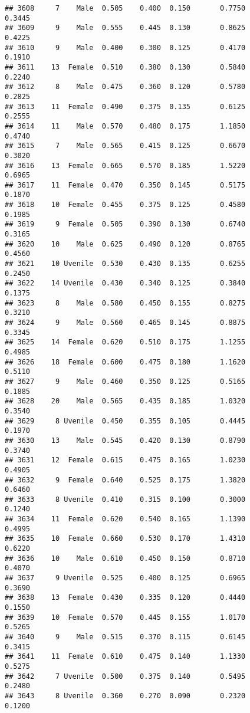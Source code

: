 \documentclass[
]{article}
\begin{document}
\begin{verbatim}
## 3608     7    Male  0.505    0.400  0.150       0.7750         0.3445
## 3609     9    Male  0.555    0.445  0.130       0.8625         0.4225
## 3610     9    Male  0.400    0.300  0.125       0.4170         0.1910
## 3611    13  Female  0.510    0.380  0.130       0.5840         0.2240
## 3612     8    Male  0.475    0.360  0.120       0.5780         0.2825
## 3613    11  Female  0.490    0.375  0.135       0.6125         0.2555
## 3614    11    Male  0.570    0.480  0.175       1.1850         0.4740
## 3615     7    Male  0.565    0.415  0.125       0.6670         0.3020
## 3616    13  Female  0.665    0.570  0.185       1.5220         0.6965
## 3617    11  Female  0.470    0.350  0.145       0.5175         0.1870
## 3618    10  Female  0.455    0.375  0.125       0.4580         0.1985
## 3619     9  Female  0.505    0.390  0.130       0.6740         0.3165
## 3620    10    Male  0.625    0.490  0.120       0.8765         0.4560
## 3621    10 Uvenile  0.530    0.430  0.135       0.6255         0.2450
## 3622    14 Uvenile  0.430    0.340  0.125       0.3840         0.1375
## 3623     8    Male  0.580    0.450  0.155       0.8275         0.3210
## 3624     9    Male  0.560    0.465  0.145       0.8875         0.3345
## 3625    14  Female  0.620    0.510  0.175       1.1255         0.4985
## 3626    18  Female  0.600    0.475  0.180       1.1620         0.5110
## 3627     9    Male  0.460    0.350  0.125       0.5165         0.1885
## 3628    20    Male  0.565    0.435  0.185       1.0320         0.3540
## 3629     8 Uvenile  0.450    0.355  0.105       0.4445         0.1970
## 3630    13    Male  0.545    0.420  0.130       0.8790         0.3740
## 3631    12  Female  0.615    0.475  0.165       1.0230         0.4905
## 3632     9  Female  0.640    0.525  0.175       1.3820         0.6460
## 3633     8 Uvenile  0.410    0.315  0.100       0.3000         0.1240
## 3634    11  Female  0.620    0.540  0.165       1.1390         0.4995
## 3635    10  Female  0.660    0.530  0.170       1.4310         0.6220
## 3636    10    Male  0.610    0.450  0.150       0.8710         0.4070
## 3637     9 Uvenile  0.525    0.400  0.125       0.6965         0.3690
## 3638    13  Female  0.430    0.335  0.120       0.4440         0.1550
## 3639    10  Female  0.570    0.445  0.155       1.0170         0.5265
## 3640     9    Male  0.515    0.370  0.115       0.6145         0.3415
## 3641    11  Female  0.610    0.475  0.140       1.1330         0.5275
## 3642     7 Uvenile  0.500    0.375  0.140       0.5495         0.2480
## 3643     8 Uvenile  0.360    0.270  0.090       0.2320         0.1200

\end{verbatim}
\end{document}
